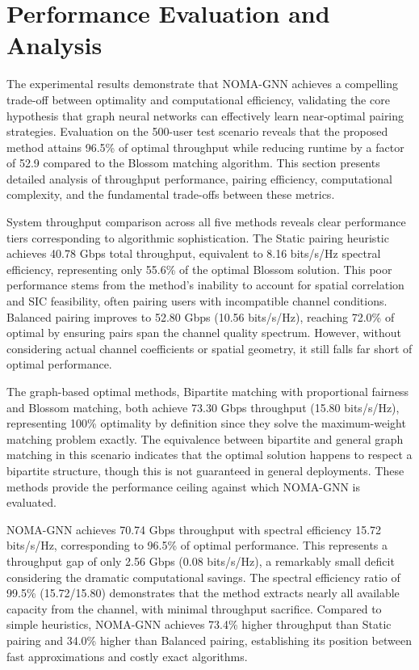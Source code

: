 \section{Performance Evaluation and Analysis}

The experimental results demonstrate that NOMA-GNN achieves a compelling trade-off between optimality and computational efficiency, validating the core hypothesis that graph neural networks can effectively learn near-optimal pairing strategies. Evaluation on the 500-user test scenario reveals that the proposed method attains 96.5\% of optimal throughput while reducing runtime by a factor of 52.9 compared to the Blossom matching algorithm. This section presents detailed analysis of throughput performance, pairing efficiency, computational complexity, and the fundamental trade-offs between these metrics.

System throughput comparison across all five methods reveals clear performance tiers corresponding to algorithmic sophistication. The Static pairing heuristic achieves 40.78 Gbps total throughput, equivalent to 8.16 bits/s/Hz spectral efficiency, representing only 55.6\% of the optimal Blossom solution. This poor performance stems from the method's inability to account for spatial correlation and SIC feasibility, often pairing users with incompatible channel conditions. Balanced pairing improves to 52.80 Gbps (10.56 bits/s/Hz), reaching 72.0\% of optimal by ensuring pairs span the channel quality spectrum. However, without considering actual channel coefficients or spatial geometry, it still falls far short of optimal performance.

The graph-based optimal methods, Bipartite matching with proportional fairness and Blossom matching, both achieve 73.30 Gbps throughput (15.80 bits/s/Hz), representing 100\% optimality by definition since they solve the maximum-weight matching problem exactly. The equivalence between bipartite and general graph matching in this scenario indicates that the optimal solution happens to respect a bipartite structure, though this is not guaranteed in general deployments. These methods provide the performance ceiling against which NOMA-GNN is evaluated.

NOMA-GNN achieves 70.74 Gbps throughput with spectral efficiency 15.72 bits/s/Hz, corresponding to 96.5\% of optimal performance. This represents a throughput gap of only 2.56 Gbps (0.08 bits/s/Hz), a remarkably small deficit considering the dramatic computational savings. The spectral efficiency ratio of 99.5\% (15.72/15.80) demonstrates that the method extracts nearly all available capacity from the channel, with minimal throughput sacrifice. Compared to simple heuristics, NOMA-GNN achieves 73.4\% higher throughput than Static pairing and 34.0\% higher than Balanced pairing, establishing its position between fast approximations and costly exact algorithms.

